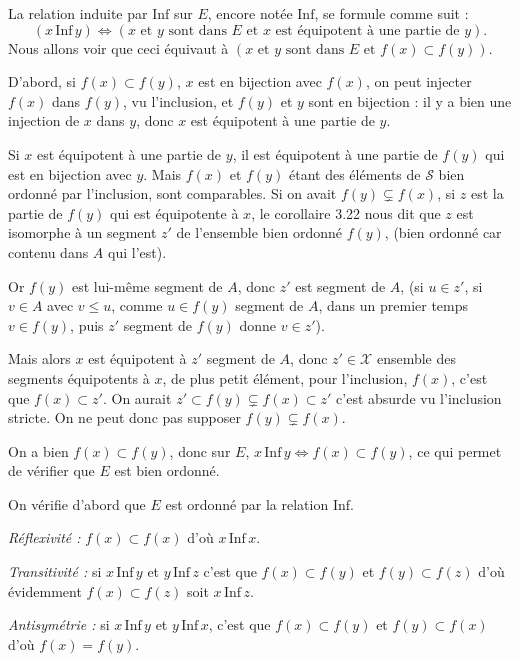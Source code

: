 La relation induite par $\mathrm{Inf}$ sur $E$, encore notée $\mathrm{Inf}$, se formule comme suit :
\[
(x\,\mathrm{Inf}\,y)\Leftrightarrow(x\text{ et }y\text{ sont dans }E\text{ et }x\text{ est équipotent à une partie de }y).
\]
Nous allons voir que ceci équivaut à $(x\text{ et }y\text{ sont dans }E\text{ et }f(x)\subset f(y))$.

D'abord, si $f(x)\subset f(y)$, $x$ est en bijection avec $f(x)$, on peut injecter $f(x)$ dans $f(y)$, vu l'inclusion, et $f(y)$ et $y$ sont en bijection : il y a bien une injection de $x$ dans $y$, donc $x$ est équipotent à une partie de $y$.

Si $x$ est équipotent à une partie de $y$, il est équipotent à une partie de $f(y)$ qui est en bijection avec $y$. Mais $f(x)$ et $f(y)$ étant des éléments de $\mathcal S$ bien ordonné par l'inclusion, sont comparables. Si on avait $f(y)\subsetneq f(x)$, si $z$ est la partie de $f(y)$ qui est équipotente à $x$, le corollaire 3.22 nous dit que $z$ est isomorphe à un segment $z'$ de l'ensemble bien ordonné $f(y)$, (bien ordonné car contenu dans $A$ qui l'est).

Or $f(y)$ est lui-même segment de $A$, donc $z'$ est segment de $A$, (si $u\in z'$, si $v\in A$ avec $v\le u$, comme $u\in f(y)$ segment de $A$, dans un premier temps $v\in f(y)$, puis $z'$ segment de $f(y)$ donne $v\in z'$).

Mais alors $x$ est équipotent à $z'$ segment de $A$, donc $z'\in\mathcal X$ ensemble des segments équipotents à $x$, de plus petit élément, pour l'inclusion, $f(x)$, c'est que $f(x)\subset z'$. On aurait $z'\subset f(y)\subsetneq f(x)\subset z'$ c'est absurde vu l'inclusion stricte. On ne peut donc pas supposer $f(y)\subsetneq f(x)$.

On a bien $f(x)\subset f(y)$, donc sur $E$, $x\,\mathrm{Inf}\,y\Leftrightarrow f(x)\subset f(y)$, ce qui permet de vérifier que $E$ est bien ordonné.

On vérifie d'abord que $E$ est ordonné par la relation $\mathrm{Inf}$.

\emph{Réflexivité :} $f(x)\subset f(x)$ d'où $x\,\mathrm{Inf}\,x$.

\emph{Transitivité :} si $x\,\mathrm{Inf}\,y$ et $y\,\mathrm{Inf}\,z$ c'est que $f(x)\subset f(y)$ et $f(y)\subset f(z)$ d'où évidemment $f(x)\subset f(z)$ soit $x\,\mathrm{Inf}\,z$.

\emph{Antisymétrie :} si $x\,\mathrm{Inf}\,y$ et $y\,\mathrm{Inf}\,x$, c'est que $f(x)\subset f(y)$ et $f(y)\subset f(x)$ d'où $f(x)=f(y)$.


